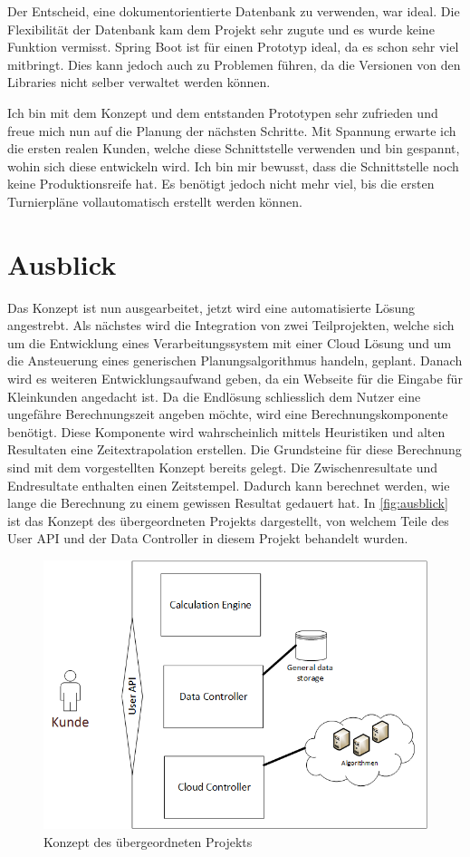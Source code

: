 Der Entscheid, eine dokumentorientierte Datenbank zu verwenden, war ideal. Die Flexibilität der Datenbank kam dem Projekt sehr zugute und es wurde keine Funktion vermisst. Spring Boot ist für 
einen Prototyp ideal, da es schon sehr viel mitbringt. Dies kann jedoch auch zu Problemen führen, da die Versionen von den Libraries nicht selber verwaltet werden können. 

Ich bin mit dem Konzept und dem entstanden Prototypen sehr zufrieden und freue mich nun auf die Planung der nächsten Schritte. Mit Spannung erwarte ich die ersten realen Kunden, welche diese 
Schnittstelle verwenden und bin gespannt, wohin sich diese entwickeln wird. Ich bin mir bewusst, dass die Schnittstelle noch keine Produktionsreife hat. Es benötigt jedoch nicht mehr viel, bis die ersten 
Turnierpläne vollautomatisch erstellt werden können.

\section{Ausblick}\label{fazit_ausblick}

Das Konzept ist nun ausgearbeitet, jetzt wird eine automatisierte Lösung angestrebt. Als nächstes wird die Integration von zwei Teilprojekten, welche sich um die Entwicklung eines 
Verarbeitungssystem mit einer Cloud Lösung und um die Ansteuerung eines generischen Planungsalgorithmus handeln, geplant. Danach wird es weiteren Entwicklungsaufwand geben, da ein 
Webseite für die Eingabe für Kleinkunden angedacht ist. Da die Endlösung schliesslich dem Nutzer eine ungefähre Berechnungszeit angeben möchte, wird eine Berechnungskomponente 
benötigt. Diese Komponente wird wahrscheinlich mittels Heuristiken und alten Resultaten eine Zeitextrapolation erstellen. Die Grundsteine für diese Berechnung sind mit dem vorgestellten Konzept 
bereits gelegt. Die Zwischenresultate und Endresultate enthalten einen Zeitstempel. Dadurch kann berechnet werden, wie lange die Berechnung zu einem gewissen Resultat gedauert hat. In 
\autoref{fig:ausblick} ist das Konzept des übergeordneten Projekts dargestellt, von welchem Teile des User API und der Data Controller in diesem Projekt behandelt wurden.

\begin{figure}[h]
\centering
\includegraphics[scale=0.8]{images/visio/ausblick.png}
\caption[Konzept des übergeordneten Projekts]{Konzept des übergeordneten Projekts \selfmade{}}
\label{fig:ausblick}
\end{figure}